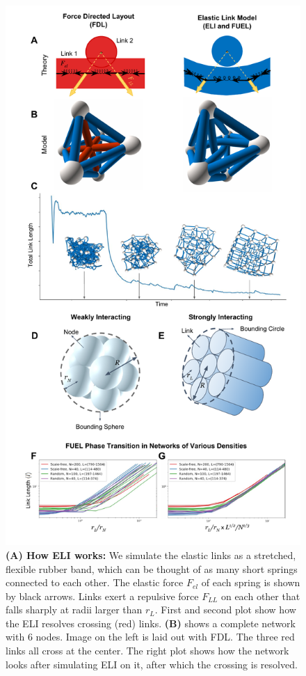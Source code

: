 \documentclass[nofootinbib,preprint,floatfix,titlepage,endfloats,superscriptaddress]{revtex4} %
\begin{document}
\begin{figure}
    \centering
    \includegraphics[width=.7\columnwidth]{fig-09-19/3d-crs-lat-trans-2.pdf}
    \caption{
    \scriptsize
    {\bf(A) How ELI works:} We simulate the elastic links as a stretched, flexible rubber band, which can be thought of as many short springs connected to each other. 
    The elastic force $F_{el}$ of each spring is shown by black arrows.
    Links exert a repulsive force $F_{LL}$  on each other that falls sharply at radii larger than $r_L$. 
    First and second plot show how the ELI resolves crossing (red) links. {\bf(B)} shows a complete network with 6 nodes. Image on the left is laid out with FDL. The three red links all cross at the center. The right plot shows how the network looks after simulating ELI on it, after which the crossing is resolved.
}
\end{figure}
\end{document}
